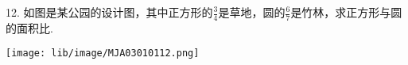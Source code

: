 12.	如图是某公园的设计图，其中正方形的$\frac{3}{4}$是草地，圆的$\frac{6}{7}$是竹林，求正方形与圆的面积比. \\

\begin{flushright}

    \texttt{[image: lib/image/MJA03010112.png]}

\end{flushright} 





